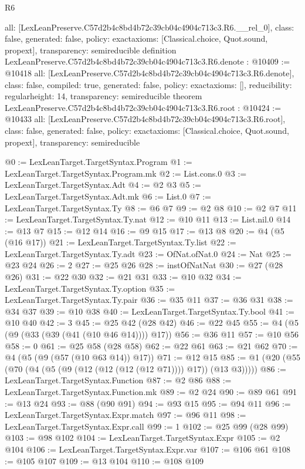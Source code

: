 \begin{lexlean}{R6}
\begin{coremodule}
{  all: [LexLeanPreserve.C57d2b4c8bd4b72c39cb04c4904c713c3.R6.__rel_0],
  class: false,
  generated: false,
  policy: exact{axioms: [Classical.choice, Quot.sound, propext]},
  transparency: semireducible
}
definition LexLeanPreserve.C57d2b4c8bd4b72c39cb04c4904c713c3.R6.denote : @10409 := @10418 {
  all: [LexLeanPreserve.C57d2b4c8bd4b72c39cb04c4904c713c3.R6.denote],
  class: false,
  compiled: true,
  generated: false,
  policy: exact{axioms: []},
  reducibility: regular{height: 14},
  transparency: semireducible
}
theorem LexLeanPreserve.C57d2b4c8bd4b72c39cb04c4904c713c3.R6.root : @10424 := @10433 {
  all: [LexLeanPreserve.C57d2b4c8bd4b72c39cb04c4904c713c3.R6.root],
  class: false,
  generated: false,
  policy: exact{axioms: [Classical.choice, Quot.sound, propext]},
  transparency: semireducible
}

@0 := LexLeanTarget.TargetSyntax.Program
@1 := LexLeanTarget.TargetSyntax.Program.mk
@2 := List.cons.{0}
@3 := LexLeanTarget.TargetSyntax.Adt
@4 := @2 @3
@5 := LexLeanTarget.TargetSyntax.Adt.mk
@6 := List.{0}
@7 := LexLeanTarget.TargetSyntax.Ty
@8 := @6 @7
@9 := @2 @8
@10 := @2 @7
@11 := LexLeanTarget.TargetSyntax.Ty.nat
@12 := @10 @11
@13 := List.nil.{0}
@14 := @13 @7
@15 := @12 @14
@16 := @9 @15
@17 := @13 @8
@20 := @4 (@5 (@16 @17))
@21 := LexLeanTarget.TargetSyntax.Ty.list
@22 := LexLeanTarget.TargetSyntax.Ty.adt
@23 := OfNat.ofNat.{0}
@24 := Nat
@25 := @23 @24
@26 := 2
@27 := @25 @26
@28 := instOfNatNat
@30 := @27 (@28 @26)
@31 := @22 @30
@32 := @21 @31
@33 := @10 @32
@34 := LexLeanTarget.TargetSyntax.Ty.option
@35 := LexLeanTarget.TargetSyntax.Ty.pair
@36 := @35 @11
@37 := @36 @31
@38 := @34 @37
@39 := @10 @38
@40 := LexLeanTarget.TargetSyntax.Ty.bool
@41 := @10 @40
@42 := 3
@45 := @25 @42 (@28 @42)
@46 := @22 @45
@55 := @4 (@5 (@9 (@33 (@39 (@41 (@10 @46 @14)))) @17))
@56 := @36 @11
@57 := @10 @56
@58 := 0
@61 := @25 @58 (@28 @58)
@62 := @22 @61
@63 := @21 @62
@70 := @4 (@5 (@9 (@57 (@10 @63 @14)) @17))
@71 := @12 @15
@85 := @1 (@20 (@55 (@70 (@4 (@5 (@9 (@12 (@12 (@12 (@12 @71)))) @17)) (@13 @3)))))
@86 := LexLeanTarget.TargetSyntax.Function
@87 := @2 @86
@88 := LexLeanTarget.TargetSyntax.Function.mk
@89 := @2 @24
@90 := @89 @61
@91 := @13 @24
@93 := @88 (@90 @91)
@94 := @93 @15
@95 := @94 @11
@96 := LexLeanTarget.TargetSyntax.Expr.match
@97 := @96 @11
@98 := LexLeanTarget.TargetSyntax.Expr.call
@99 := 1
@102 := @25 @99 (@28 @99)
@103 := @98 @102
@104 := LexLeanTarget.TargetSyntax.Expr
@105 := @2 @104
@106 := LexLeanTarget.TargetSyntax.Expr.var
@107 := @106 @61
@108 := @105 @107
@109 := @13 @104
@110 := @108 @109

\end{coremodule}
\end{lexlean}
